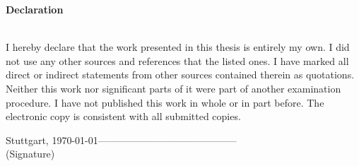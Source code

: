 \documentclass[paper=a4,       %
					 11pt,
					 BCOR0mm,  %
					 DIV10,    %
					 automark, %
					 twoside,
					 halfparskip,
					 bibtotoc,
					 headsepline,
					 normalheadings,
					 appendixprefix,
					 pagesize  %
 ]{scrbook}
\begin{document}
\pagestyle{empty}
\vspace{9cm}
\begin{center}
\begin{minipage}{11cm}
\vspace{6cm}

\textbf{\Large Declaration}\\\\
\vspace{0.4cm}

I hereby declare that the work presented in this thesis is entirely my own. 
I did not use any other sources and references that the listed ones. I have marked all direct or indirect statements from other sources contained therein as quotations. 
Neither this work nor significant parts of it were part of another examination procedure. I have not published this work in whole or in part before. 
The electronic copy is consistent with all submitted copies.
\vspace{1cm}

Stuttgart, \today \hspace{1cm}------------------------------------------\\
\phantom{Stuttgart, \today} \hspace{2.5cm} (Signature)
\end{minipage}
\end{center}
\end{document}
